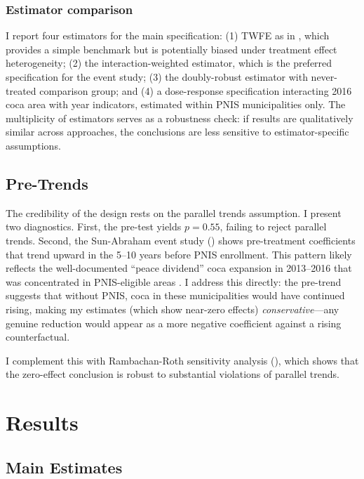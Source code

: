 \documentclass[12pt]{article}
\begin{document}
\subsubsection*{Estimator comparison} I report four estimators for the main specification: (1) TWFE as in , which provides a simple benchmark but is potentially biased under treatment effect heterogeneity; (2) the \citet{sunab2021} interaction-weighted estimator, which is the preferred specification for the event study; (3) the \citet{callaway2021} doubly-robust estimator with never-treated comparison group; and (4) a dose-response specification interacting 2016 coca area with year indicators, estimated within PNIS municipalities only. The multiplicity of estimators serves as a robustness check: if results are qualitatively similar across approaches, the conclusions are less sensitive to estimator-specific assumptions.

\subsection{Pre-Trends}

The credibility of the design rests on the parallel trends assumption. I present two diagnostics. First, the \citet{callaway2021} pre-test yields $p = 0.55$, failing to reject parallel trends. Second, the Sun-Abraham event study () shows pre-treatment coefficients that trend upward in the 5--10 years before PNIS enrollment. This pattern likely reflects the well-documented ``peace dividend'' coca expansion in 2013--2016 that was concentrated in PNIS-eligible areas \citep{unodc2017}. I address this directly: the pre-trend suggests that without PNIS, coca in these municipalities would have continued rising, making my estimates (which show near-zero effects) \emph{conservative}---any genuine reduction would appear as a more negative coefficient against a rising counterfactual.

I complement this with Rambachan-Roth sensitivity analysis (), which shows that the zero-effect conclusion is robust to substantial violations of parallel trends.

\section{Results} \label{sec:results}

\subsection{Main Estimates}
\end{document}
